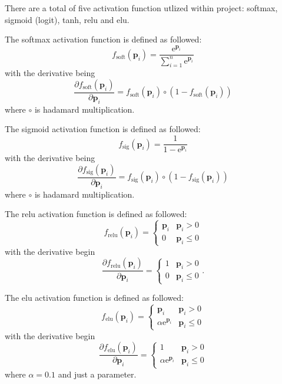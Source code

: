 \documentclass[uio,jmp,amsmath,amssymb,reprint,nofootinbib]{revtex4-1}
\numberwithin{equation}{section}
\newcommand{\e}{\mathrm{e}}
\begin{document}
There are a total of five activation function utlized within project: softmax, sigmoid (logit), tanh, relu and elu.

The softmax activation function is defined as followed:
\begin{equation}
f_{\text{soft}}(\bm{p}_i) = \frac{\e^{\bm{p}_i}}{\sum_{i=1}^n \e^{\bm{p}_i}} 
\end{equation}
with the derivative being
\begin{equation}
\frac{\partial f_{\text{soft}}(\bm{p}_i)}{\partial \bm{p}_i} = f_{\text{soft}}(\bm{p}_i)\circ(1-f_{\text{soft}}(\bm{p}_i))
\end{equation}
where \(\circ\) is hadamard multiplication.

The sigmoid activation function is defined as followed:
\begin{equation}
f_{\text{sig}}(\bm{p}_i) = \frac{1}{1- \e^{\bm{p}_i}}
\end{equation}
with the derivative being
\begin{equation}
\frac{\partial f_{\text{sig}}(\bm{p}_i)}{\partial \bm{p}_i} = f_{\text{sig}}(\bm{p}_i)\circ(1-f_{\text{sig}}(\bm{p}_i))
\end{equation}
where \(\circ\) is hadamard multiplication.

The relu activation function is defined as followed:
\begin{equation}
f_{\text{relu}}(\bm{p}_i) =
\begin{cases}
\bm{p}_i & \bm{p}_i > 0\\
0 & \bm{p}_i \leq 0
\end{cases}
\end{equation}
with the derivative begin
\begin{equation}
\frac{\partial f_{\text{relu}}(\bm{p}_i)}{\partial \bm{p}_i} =
\begin{cases}
1 & \bm{p}_i > 0\\
0 & \bm{p}_i \leq 0
\end{cases}.
\end{equation}

The elu activation function is defined as followed:
\begin{equation}
f_{\text{elu}}(\bm{p}_i) =
\begin{cases}
\bm{p}_i & \bm{p}_i > 0\\
\alpha\e^{\bm{p}_i} & \bm{p}_i \leq 0
\end{cases}
\end{equation}
with the derivative begin
\begin{equation}
\frac{\partial f_{\text{elu}}(\bm{p}_i)}{\partial \bm{p}_i} =
\begin{cases}
1 & \bm{p}_i > 0\\
\alpha\e^{\bm{p}_i} & \bm{p}_i \leq 0
\end{cases}
\end{equation}
where \(\alpha = 0.1\) and just a parameter.


\onecolumngrid


 
\end{document}
